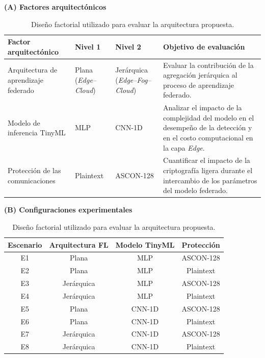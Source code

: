 \documentclass[journal,article,submit,moreauthors]{Definitions/mdpi}
\begin{document}
\begin{table}[ht]
\centering
\caption{Diseño factorial utilizado para evaluar la arquitectura propuesta.}
\label{tab:experimental_design}
\footnotesize

\textbf{(A) Factores arquitectónicos}

\vspace{0.2cm}

\begin{tabular}{p{2.75cm}p{2.5cm}p{2.75cm}p{4cm}}
\toprule
\textbf{Factor arquitectónico} &
\textbf{Nivel 1} &
\textbf{Nivel 2} &
\textbf{Objetivo de evaluación} \\
\midrule

Arquitectura de aprendizaje federado &
Plana (\textit{Edge--Cloud}) &
Jerárquica (\textit{Edge--Fog--Cloud}) &
Evaluar la contribución de la agregación jerárquica al proceso de aprendizaje federado. \\

Modelo de inferencia TinyML &
MLP &
CNN-1D &
Analizar el impacto de la complejidad del modelo en el desempeño de la detección y en el costo computacional en la capa \textit{Edge}. \\

Protección de las comunicaciones &
Plaintext &
ASCON-128 &
Cuantificar el impacto de la criptografía ligera durante el intercambio de los parámetros del modelo federado. \\

\bottomrule
\end{tabular}

\vspace{0.5cm}

\textbf{(B) Configuraciones experimentales}

\vspace{0.2cm}

\begin{tabular}{cccc}
\toprule
\textbf{Escenario} &
\textbf{Arquitectura FL} &
\textbf{Modelo TinyML} &
\textbf{Protección} \\
\midrule

E1 & Plana & MLP & ASCON-128 \\
E2 & Plana & MLP & Plaintext \\
E3 & Jerárquica & MLP & ASCON-128 \\
E4 & Jerárquica & MLP & Plaintext \\
E5 & Plana & CNN-1D & ASCON-128 \\
E6 & Plana & CNN-1D & Plaintext \\
E7 & Jerárquica & CNN-1D & ASCON-128 \\
E8 & Jerárquica & CNN-1D & Plaintext \\

\bottomrule
\end{tabular}

\end{table}
\end{document}
